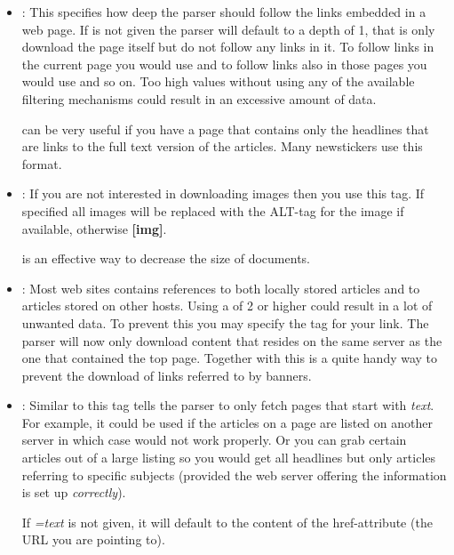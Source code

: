 \begin{itemize}
 \item {}: This specifies how
 deep the parser should follow the links embedded in a web page.
 If  is not given the parser will default to a depth
 of 1, that is only download the page itself but do not follow any
 links in it. To follow links in the current page you would use
  and to follow links also in those pages you would
 use  and so on. Too high values without using any
 of the available filtering mechanisms could result in an excessive
 amount of data.

 \hint{}  can be very useful if you have a page that
 contains only the headlines that are links to the full text version
 of the articles. Many newstickers use this format.

 \item {}: If you are not interested
 in downloading images
 then you use this tag. If specified all images will be replaced with
 the ALT-tag for the image if available, otherwise \textbf{[img]}.

 \hint{}  is an effective way to decrease the size of
 documents.

 \item {}: Most web sites contains
 references to both locally stored articles and to articles stored on
 other hosts. Using a  of 2 or higher could result in a
 lot of unwanted data.  To prevent this you may specify the 
 tag for your link. The parser will now only download content that resides
 on the same server as the one that contained the top page. Together with
  this is a quite handy way to prevent the download
 of links referred to by banners.

 \item {}: Similar to
  this tag tells the parser to only fetch pages that
 start with \emph{text}.  For example, it could be used if the
 articles on a page are listed on another server in which case
  would not work properly.  Or you can grab certain
 articles out of a large listing so you would get all headlines but
 only articles referring to specific subjects (provided the web server
 offering the information is set up \emph{correctly}).

 \note If \emph{=text} is not given, it will default to the content
 of the href-attribute (the URL you are pointing to).


\end{itemize}
